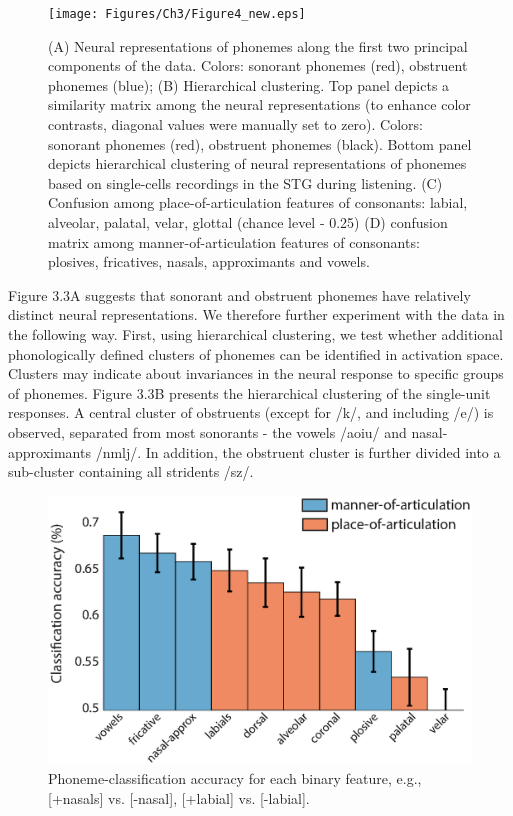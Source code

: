 \begin{figure}[H]
\vspace{.3in}
\texttt{[image: Figures/Ch3/Figure4\_new.eps]}
\caption{(A) Neural representations of phonemes along the first two principal components of the data. Colors: sonorant phonemes (red), obstruent phonemes (blue); (B) Hierarchical clustering. Top panel depicts a similarity matrix among the neural representations (to enhance color contrasts, diagonal values were manually set to zero). Colors: sonorant phonemes (red), obstruent phonemes (black). Bottom panel depicts hierarchical clustering of neural representations of phonemes based on single-cells recordings in the STG during listening. (C) Confusion among place-of-articulation features of consonants: labial, alveolar, palatal, velar, glottal (chance level - 0.25) (D) confusion matrix among manner-of-articulation features of consonants: plosives, fricatives, nasals, approximants and vowels.}
\end{figure}

Figure 3.3A suggests that sonorant and obstruent phonemes have relatively distinct neural representations. We therefore further experiment with the data in the following way. First, using hierarchical clustering, we test whether additional phonologically defined clusters of phonemes can be identified in activation space. Clusters may indicate about invariances in the neural response to specific groups of phonemes. Figure 3.3B presents the hierarchical clustering of the single-unit responses. A central cluster of obstruents (except for /k/, and including /e/) is observed, separated from most sonorants - the vowels /aoiu/ and nasal-approximants /nmlj/. In addition, the obstruent cluster is further divided into a sub-cluster containing all stridents /sz/. 

\begin{figure}[H]
\vspace{.3in}
\includegraphics[width=\linewidth]{Figures/Ch3/Figure5_new.eps}
\caption{Phoneme-classification accuracy for each binary feature, e.g., [+nasals] vs. [-nasal], [+labial] vs. [-labial].}
\end{figure}

